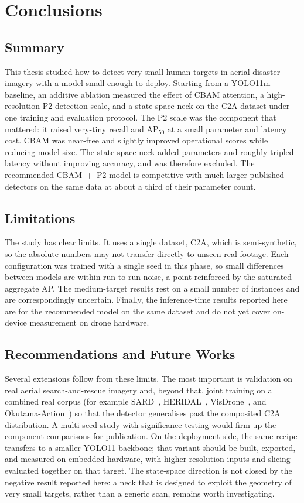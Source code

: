 \chapter{Conclusions}

\section{Summary}
This thesis studied how to detect very small human targets in aerial disaster
imagery with a model small enough to deploy. Starting from a YOLO11m baseline, an
additive ablation measured the effect of CBAM attention, a high-resolution P2
detection scale, and a state-space neck on the C2A dataset under one training and
evaluation protocol. The P2 scale was the component that mattered: it raised
very-tiny recall and $\mathrm{AP}_{50}$ at a small parameter and latency cost. CBAM
was near-free and slightly improved operational scores while reducing model size.
The state-space neck added parameters and roughly tripled latency without improving
accuracy, and was therefore excluded. The recommended CBAM~+~P2 model is
competitive with much larger published detectors on the same data at about a third
of their parameter count.

\section{Limitations}
The study has clear limits. It uses a single dataset, C2A, which is semi-synthetic,
so the absolute numbers may not transfer directly to unseen real footage. Each
configuration was trained with a single seed in this phase, so small differences
between models are within run-to-run noise, a point reinforced by the saturated
aggregate AP. The medium-target results rest on a small number of instances and are
correspondingly uncertain. Finally, the inference-time results reported here
are for the recommended model on the same dataset and do not yet cover
on-device measurement on drone hardware.

\section{Recommendations and Future Works}
Several extensions follow from these limits. The most important is validation on
real aerial search-and-rescue imagery and, beyond that, joint training on a
combined real corpus (for example SARD~\cite{sambolek2021sard},
HERIDAL~\cite{bozic2019heridal}, VisDrone~\cite{zhu2021visdrone}, and
Okutama-Action~\cite{barekatain2017okutama}) so that the detector generalises
past the composited C2A distribution. A multi-seed study with significance testing would firm up the
component comparisons for publication. On the deployment side, the same recipe
transfers to a smaller YOLO11 backbone; that variant should be built, exported,
and measured on embedded hardware, with higher-resolution inputs and slicing
evaluated together on that target. The state-space
direction is not closed by the negative result reported here: a neck that is
designed to exploit the geometry of very small targets, rather than a generic scan,
remains worth investigating.
